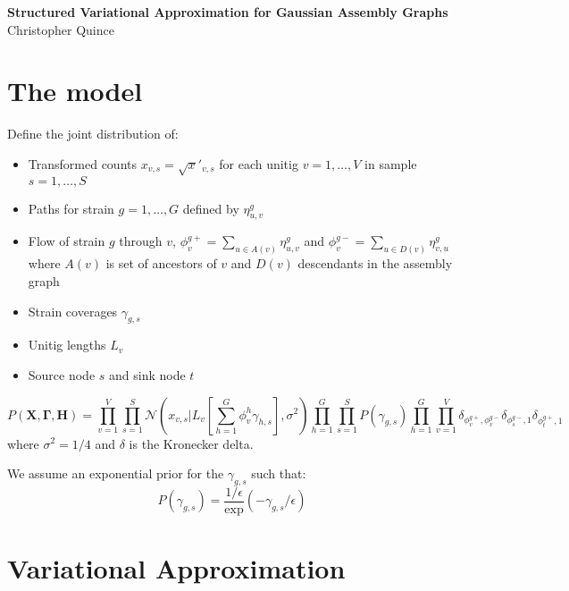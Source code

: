 \documentclass[10pt]{article}
\date{}
\newcommand\titlestring{Structured Variational Approximation for Gaussian Assembly Graphs}
\newcommand\authorstring{Christopher Quince}
\begin{document}
\begin{flushleft}
  {\Large
    \textbf{\titlestring}
  }
\\
\authorstring
\end{flushleft}

\section{The model}

Define the joint distribution of: 
\begin{itemize}

\item Transformed counts $x_{v,s} = \sqrt x'_{v,s}$ for each unitig $v = 1,\ldots,V$ in sample $s = 1,\ldots,S$

\item Paths for strain $g = 1,\ldots,G$ defined by $\eta^g_{u,v}$

\item Flow of strain $g$ through $v$, $\phi^{g+}_v = \sum_{u \in A(v)} \eta^g_{u,v}$ 
and $\phi^{g-}_v = \sum_{u \in D(v)} \eta^g_{v,u}$ where $A(v)$ is set of ancestors of $v$ 
and $D(v)$ descendants in the assembly graph

\item Strain coverages $\gamma_{g,s}$

\item Unitig lengths $L_v$

\item Source node $s$ and sink node $t$

\end{itemize}

\begin{equation}
P(\mathbf{X},\mathbf{\Gamma},\mathbf{H})  = \prod_{v=1}^V \prod_{s=1}^S \mathcal{N}(x_{v,s}|L_v [\sum_{h=1}^G \phi^h_v \gamma_{h,s}],\sigma^2) 
\prod_{h=1}^G \prod_{s=1}^S P(\gamma_{g,s})
\prod_{h=1}^G \prod_{v=1}^V \delta_{ \phi^{g+}_v, \phi^{g-}_v}
 \delta_{\phi^{g-}_s,1}  \delta_{\phi^{g+}_t,1} 
\end{equation}
where $\sigma^2 = 1/4$ and $\delta$ is the Kronecker delta.

We assume an exponential prior for the $\gamma_{g,s}$ such that:
\begin{equation}
P(\gamma_{g,s}) = \frac{1/\epsilon} \exp(-\gamma_{g,s}/\epsilon)
\end{equation}

\section{Variational Approximation}
\end{document}
